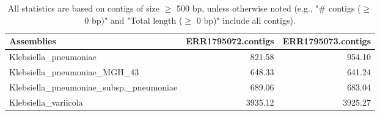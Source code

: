 \documentclass[12pt,a4paper]{article}
\begin{document}
\begin{table}[ht]
\begin{center}
\caption{All statistics are based on contigs of size $\geq$ 500 bp, unless otherwise noted (e.g., "\# contigs ($\geq$ 0 bp)" and "Total length ($\geq$ 0 bp)" include all contigs).}
\begin{tabular}{|l*{2}{|r}|}
\hline
Assemblies & ERR1795072.contigs & ERR1795073.contigs \\ \hline
Klebsiella\_pneumoniae & 821.58 & 954.10 \\ \hline
Klebsiella\_pneumoniae\_MGH\_43 & 648.33 & 641.24 \\ \hline
Klebsiella\_pneumoniae\_subsp.\_pneumoniae & 689.06 & 683.04 \\ \hline
Klebsiella\_variicola & 3935.12 & 3925.27 \\ \hline
\end{tabular}
\end{center}
\end{table}
\end{document}
